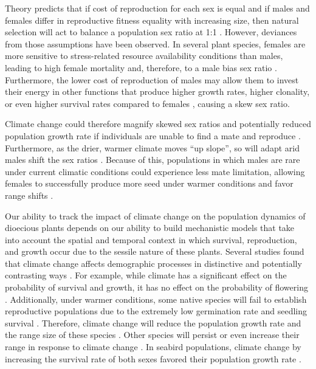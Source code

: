\documentclass[11pt]{article}
\begin{document}
Theory predicts that if cost of reproduction for each sex is equal and if males and females differ in reproductive fitness equality with increasing size, then natural selection will act to balance a population sex ratio at 1:1 \citep{Fisher1930}.  However, deviances from those assumptions have been observed.
In several plant species, females are more sensitive to stress-related resource availability conditions than males, leading to high female mortality and, therefore, to a male bias sex ratio \citep{hultine2016climate,freeman1976differential}. 
Furthermore, the lower cost of reproduction of males may allow them to invest their energy in other functions that produce higher growth rates, higher clonality, or even higher survival rates compared to females \citep{bruijning2017surviving}, causing a skew sex ratio.

Climate change could therefore magnify skewed sex ratios and potentially reduced population growth rate if individuals are unable to find a mate and reproduce \citep{morrison2016causes}.
Furthermore, as the drier, warmer climate moves “up slope”, so will adapt arid males shift the sex ratios \citep{petry2016sex}.
Because of this, populations in which males are rare under current climatic conditions could experience less mate limitation, allowing females to successfully produce more seed under warmer conditions  and favor range shifts \citep{petry2016sex}. 

Our ability to track the impact of climate change on the population dynamics of dioecious plants depends on our ability to build mechanistic models that take into account the spatial and temporal context in which survival, reproduction, and growth occur due to the sessile nature of these plants.
Several studies found that climate change affects demographic processes in distinctive and potentially contrasting ways \citep{dalgleish2011climate}. For example, while climate has a significant effect on the probability of survival and growth, it has no effect on the probability of flowering \citep{greiser2020climate}. Additionally, under warmer conditions, some native species will fail to establish reproductive populations due to the extremely low germination rate and seedling survival \citep{Reed2021}. Therefore, climate change will reduce the population growth rate and the range size of these species \citep{reed2021climate}. 
Other species will persist or even increase their range in response to climate change \citep{williams2015life,merow2017climate}. 
In seabird populations, climate change by increasing the survival rate of both sexes favored their population growth rate \citep{gianuca2019sex}.
\end{document}
